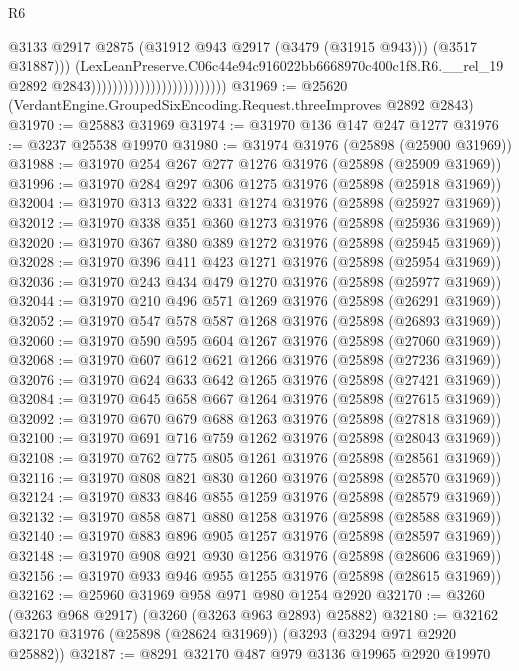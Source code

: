 \begin{lexlean}{R6}
\begin{coremodule}
                                                        @3133
                                                        @2917
                                                        @2875
                                                        (@31912 @943 @2917 (@3479 (@31915 @943)))
                                                        (@3517 @31887)))
                                                    (LexLeanPreserve.C06c44e94c916022bb6668970c400c1f8.R6.__rel_19
                                                      @2892
                                                      @2843)))))))))))))))))))))))))
@31969 := @25620 (VerdantEngine.GroupedSixEncoding.Request.threeImproves @2892 @2843)
@31970 := @25883 @31969
@31974 := @31970 @136 @147 @247 @1277
@31976 := @3237 @25538 @19970
@31980 := @31974 @31976 (@25898 (@25900 @31969))
@31988 := @31970 @254 @267 @277 @1276 @31976 (@25898 (@25909 @31969))
@31996 := @31970 @284 @297 @306 @1275 @31976 (@25898 (@25918 @31969))
@32004 := @31970 @313 @322 @331 @1274 @31976 (@25898 (@25927 @31969))
@32012 := @31970 @338 @351 @360 @1273 @31976 (@25898 (@25936 @31969))
@32020 := @31970 @367 @380 @389 @1272 @31976 (@25898 (@25945 @31969))
@32028 := @31970 @396 @411 @423 @1271 @31976 (@25898 (@25954 @31969))
@32036 := @31970 @243 @434 @479 @1270 @31976 (@25898 (@25977 @31969))
@32044 := @31970 @210 @496 @571 @1269 @31976 (@25898 (@26291 @31969))
@32052 := @31970 @547 @578 @587 @1268 @31976 (@25898 (@26893 @31969))
@32060 := @31970 @590 @595 @604 @1267 @31976 (@25898 (@27060 @31969))
@32068 := @31970 @607 @612 @621 @1266 @31976 (@25898 (@27236 @31969))
@32076 := @31970 @624 @633 @642 @1265 @31976 (@25898 (@27421 @31969))
@32084 := @31970 @645 @658 @667 @1264 @31976 (@25898 (@27615 @31969))
@32092 := @31970 @670 @679 @688 @1263 @31976 (@25898 (@27818 @31969))
@32100 := @31970 @691 @716 @759 @1262 @31976 (@25898 (@28043 @31969))
@32108 := @31970 @762 @775 @805 @1261 @31976 (@25898 (@28561 @31969))
@32116 := @31970 @808 @821 @830 @1260 @31976 (@25898 (@28570 @31969))
@32124 := @31970 @833 @846 @855 @1259 @31976 (@25898 (@28579 @31969))
@32132 := @31970 @858 @871 @880 @1258 @31976 (@25898 (@28588 @31969))
@32140 := @31970 @883 @896 @905 @1257 @31976 (@25898 (@28597 @31969))
@32148 := @31970 @908 @921 @930 @1256 @31976 (@25898 (@28606 @31969))
@32156 := @31970 @933 @946 @955 @1255 @31976 (@25898 (@28615 @31969))
@32162 := @25960 @31969 @958 @971 @980 @1254 @2920
@32170 := @3260 (@3263 @968 @2917) (@3260 (@3263 @963 @2893) @25882)
@32180 := @32162 @32170 @31976 (@25898 (@28624 @31969)) (@3293 (@3294 @971 @2920 @25882))
@32187 := @8291 @32170 @487 @979 @3136 @19965 @2920 @19970

\end{coremodule}
\end{lexlean}
